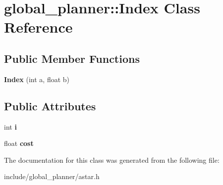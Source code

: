 \hypertarget{classglobal__planner_1_1_index}{}\section{global\+\_\+planner\+:\+:Index Class Reference}
\label{classglobal__planner_1_1_index}
\subsection*{Public Member Functions}
\begin{DoxyCompactItemize}
\item 
\mbox{\label{classglobal__planner_1_1_index_a52b5549609f2fbdf06a5e47b3b335492}} 
{\bfseries Index} (int a, float b)
\end{DoxyCompactItemize}
\subsection*{Public Attributes}
\begin{DoxyCompactItemize}
\item 
\mbox{\label{classglobal__planner_1_1_index_a5eaa92e0b2baa2b4e5b93ff2c5ad2514}} 
int {\bfseries i}
\item 
\mbox{\label{classglobal__planner_1_1_index_a014931e74c546a0315feeb4c619f7ee1}} 
float {\bfseries cost}
\end{DoxyCompactItemize}


The documentation for this class was generated from the following file\+:\begin{DoxyCompactItemize}
\item 
include/global\+\_\+planner/astar.\+h\end{DoxyCompactItemize}
